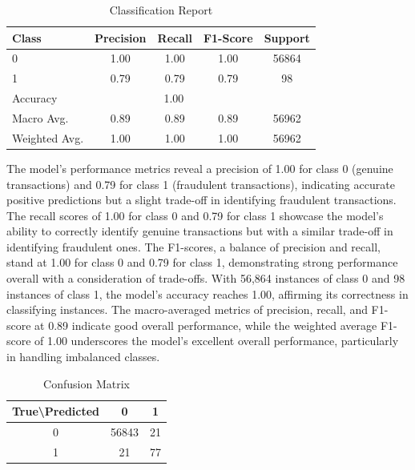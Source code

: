 \documentclass{article}
\begin{document}
\begin{table}[H]
    \centering
    \caption{Classification Report}
    \label{tab:best_model_classification_report}
    \begin{tabular}{@{}lcccc@{}}
    \toprule
    Class & Precision & Recall & F1-Score & Support \\ \midrule
    0     & 1.00      & 1.00   & 1.00     & 56864   \\
    1     & 0.79      & 0.79   & 0.79     & 98      \\ \midrule
    Accuracy & \multicolumn{3}{c}{\hspace{3cm} 1.00} & \\ \midrule
    Macro Avg.  & 0.89      & 0.89   & 0.89     & 56962   \\
    Weighted Avg. & 1.00    & 1.00   & 1.00     & 56962   \\ \bottomrule
    \end{tabular}
\end{table}


The model's performance metrics reveal a precision of 1.00 for class 0 (genuine transactions) and 0.79 for class 1 (fraudulent transactions), indicating accurate positive predictions but a slight trade-off in identifying fraudulent transactions. The recall scores of 1.00 for class 0 and 0.79 for class 1 showcase the model's ability to correctly identify genuine transactions but with a similar trade-off in identifying fraudulent ones. The F1-scores, a balance of precision and recall, stand at 1.00 for class 0 and 0.79 for class 1, demonstrating strong performance overall with a consideration of trade-offs. With 56,864 instances of class 0 and 98 instances of class 1, the model's accuracy reaches 1.00, affirming its correctness in classifying instances. The macro-averaged metrics of precision, recall, and F1-score at 0.89 indicate good overall performance, while the weighted average F1-score of 1.00 underscores the model's excellent overall performance, particularly in handling imbalanced classes.


\begin{table}[H]
\centering
\caption{Confusion Matrix}
\begin{tabular}{|c|c|c|}
\hline
True\textbackslash Predicted & 0 & 1 \\
\hline
0 & 56843 & 21 \\
1 & 21 & 77 \\
\hline
\end{tabular}
\end{table}
\end{document}
